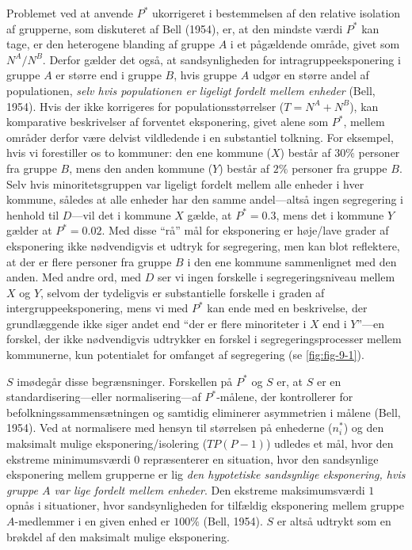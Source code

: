 \documentclass[
]{book}
\begin{document}
Problemet ved at anvende \(P^{*}\) ukorrigeret i bestemmelsen af den relative isolation af grupperne, som diskuteret af Bell (1954), er, at den mindste værdi \(P^{*}\) kan tage, er den heterogene blanding af gruppe \(A\) i et pågældende område, givet som \(N^{A}/N^{B}\). Derfor gælder det også, at sandsynligheden for intragruppeeksponering i gruppe \(A\) er større end i gruppe \(B\), hvis gruppe \(A\) udgør en større andel af populationen, \emph{selv hvis populationen er ligeligt fordelt mellem enheder} (Bell, 1954). Hvis der ikke korrigeres for populationsstørrelser (\(T=N^{A}+N^{B}\)), kan komparative beskrivelser af forventet eksponering, givet alene som \(P^{*}\), mellem områder derfor være delvist vildledende i en substantiel tolkning. For eksempel, hvis vi forestiller os to kommuner: den ene kommune (\(X\)) består af \(30\%\) personer fra gruppe \(B\), mens den anden kommune (\(Y\)) består af \(2\%\) personer fra gruppe \(B\). Selv hvis minoritetsgruppen var ligeligt fordelt mellem alle enheder i hver kommune, således at alle enheder har den samme andel---altså ingen segregering i henhold til \(D\)---vil det i kommune \(X\) gælde, at \(P^{*}=0.3\), mens det i kommune \(Y\) gælder at \(P^{*}=0.02\). Med disse ``rå'' mål for eksponering er høje/lave grader af eksponering ikke nødvendigvis et udtryk for segregering, men kan blot reflektere, at der er flere personer fra gruppe \(B\) i den ene kommune sammenlignet med den anden. Med andre ord, med \(D\) ser vi ingen forskelle i segregeringsniveau mellem \(X\) og \(Y\), selvom der tydeligvis er substantielle forskelle i graden af intergruppeeksponering, mens vi med \(P^{*}\) kan ende med en beskrivelse, der grundlæggende ikke siger andet end ``der er flere minoriteter i \(X\) end i \(Y\)''---en forskel, der ikke nødvendigvis udtrykker en forskel i segregeringsprocesser mellem kommunerne, kun potentialet for omfanget af segregering (se \ref{fig:fig-9-1}).

\(S\) imødegår disse begrænsninger. Forskellen på \(P^{*}\) og \(S\) er, at \(S\) er en standardisering---eller normalisering---af \(P^{*}\)-målene, der kontrollerer for befolkningssammensætningen og samtidig eliminerer asymmetrien i målene (Bell, 1954). Ved at normalisere med hensyn til størrelsen på enhederne (\(n_{i}^{*}\)) og den maksimalt mulige eksponering/isolering (\(TP(P-1)\)) udledes et mål, hvor den ekstreme minimumsværdi \(0\) repræsenterer en situation, hvor den sandsynlige eksponering mellem grupperne er lig \emph{den hypotetiske sandsynlige eksponering, hvis gruppe \(A\) var lige fordelt mellem enheder}. Den ekstreme maksimumsværdi \(1\) opnås i situationer, hvor sandsynligheden for tilfældig eksponering mellem gruppe \(A\)-medlemmer i en given enhed er \(100\%\) (Bell, 1954). \(S\) er altså udtrykt som en brøkdel af den maksimalt mulige eksponering.
\end{document}
